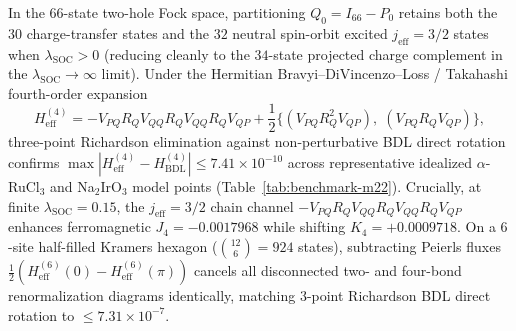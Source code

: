 \documentclass[11pt,oneside]{memoir}
\begin{document}
In the $66$-state two-hole Fock space, partitioning $Q_0 = I_{66} - P_0$ retains both the $30$ charge-transfer states and the $32$ neutral spin-orbit excited $j_{\mathrm{eff}}=3/2$ states when $\lambda_{\mathrm{SOC}} > 0$ (reducing cleanly to the $34$-state projected charge complement in the $\lambda_{\mathrm{SOC}} \to \infty$ limit). Under the Hermitian Bravyi--DiVincenzo--Loss / Takahashi fourth-order expansion
\begin{equation}
  H_{\mathrm{eff}}^{(4)} = -V_{PQ} R_Q V_{QQ} R_Q V_{QQ} R_Q V_{QP}
  + \frac{1}{2}\Big\{(V_{PQ} R_Q^2 V_{QP}),\; (V_{PQ} R_Q V_{QP})\Big\},
\end{equation}
three-point Richardson elimination against non-perturbative BDL direct rotation confirms $\max|H_{\mathrm{eff}}^{(4)} - H_{\mathrm{BDL}}^{(4)}| \le 7.41 \times 10^{-10}$ across representative idealized $\alpha$-RuCl$_3$ and Na$_2$IrO$_3$ model points (Table~\ref{tab:benchmark-m22}). Crucially, at finite $\lambda_{\mathrm{SOC}}=0.15$, the $j_{\mathrm{eff}}=3/2$ chain channel $-V_{PQ} R_Q V_{QQ} R_Q V_{QQ} R_Q V_{QP}$ enhances ferromagnetic $J_4 = -0.0017968$ while shifting $K_4 = +0.0009718$. On a $6$-site half-filled Kramers hexagon ($\binom{12}{6}=924$ states), subtracting Peierls fluxes $\frac{1}{2}(H_{\mathrm{eff}}^{(6)}(0) - H_{\mathrm{eff}}^{(6)}(\pi))$ cancels all disconnected two- and four-bond renormalization diagrams identically, matching $3$-point Richardson BDL direct rotation to $\le 7.31 \times 10^{-7}$.

\begin{table}[htbp]
  \centering
  \scriptsize
  \caption{Idealized Hubbard--Kanamori--SOC second- plus fourth-order couplings and 6-site hexagon ring-exchange benchmarks (from \texttt{extended\_kitaev\_material\_couplings.dat}).}
  \label{tab:benchmark-m22}
\end{table}
\end{document}
